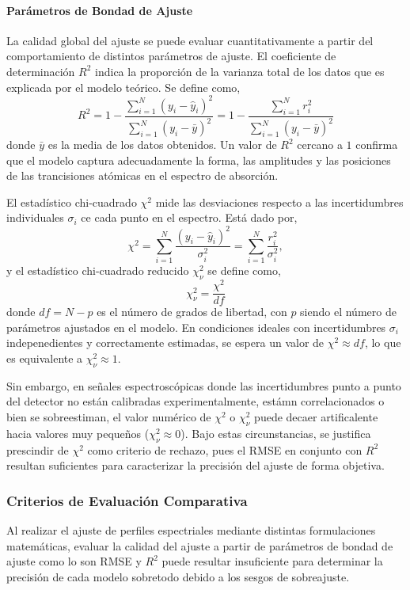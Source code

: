 \paragraph{Parámetros de Bondad de Ajuste}
La calidad global del ajuste se puede evaluar cuantitativamente a partir del comportamiento de distintos parámetros de ajuste. El coeficiente de determinación $R^2$ indica la proporción de la varianza total de los datos que es explicada por el modelo teórico. Se define como,
\begin{equation}
R^2 = 1 - \frac{\sum_{i=1}^N (y_i - \hat{y}_i)^2}{\sum_{i=1}^N (y_i - \bar{y})^2} = 1 - \frac{\sum_{i=1}^N r_i^2}{\sum_{i=1}^N (y_i - \bar{y})^2}
\end{equation}
donde $\bar{y}$ es la media de los datos obtenidos. Un valor de $R^2$ cercano a $1$ confirma que el modelo captura adecuadamente la forma, las amplitudes y las posiciones de las trancisiones atómicas en el espectro de absorción.

El estadístico chi-cuadrado $\chi^2$ mide las desviaciones respecto a las incertidumbres individuales $\sigma_i$ ce cada punto en el espectro. Está dado por,
\begin{equation}
    \chi^2 = \sum_{i=1}^N \frac{(y_i - \hat{y}_i)^2}{\sigma_i^2} = \sum_{i=1}^N \frac{r_i^2}{\sigma_i^2},
\end{equation}
y el estadístico chi-cuadrado reducido $\chi^2_\nu$ se define como,
\begin{equation}
    \chi^2_\nu = \frac{\chi^2}{df}
\end{equation}
donde $df = N - p$ es el número de grados de libertad, con $p$ siendo el número de parámetros ajustados en el modelo. En condiciones ideales con incertidumbres $\sigma_i$ indepenedientes y correctamente estimadas, se espera un valor de $\chi^2 \approx df$, lo que es equivalente a $\chi^2_\nu \approx 1$.

Sin embargo, en señales espectroscópicas donde las incertidumbres punto a punto del detector no están calibradas experimentalmente, estámn correlacionados o bien se sobreestiman, el valor numérico  de $\chi^2$ o $\chi^2_\nu$ puede decaer artificalente hacia valores muy pequeños ($\chi^2_\nu \approx 0$). Bajo estas circunstancias, se justifica prescindir de $\chi^2$ como criterio de rechazo, pues el RMSE en conjunto con $R^2$ resultan suficientes para caracterizar la precisión del ajuste de forma objetiva. 

\subsubsection{Criterios de Evaluación Comparativa}
Al realizar el ajuste de perfiles espectriales mediante distintas formulaciones matemáticas, evaluar la calidad del ajuste a partir de parámetros de bondad de ajuste como lo son RMSE y $R^2$ puede resultar insuficiente para determinar la precisión de cada modelo sobretodo debido a los sesgos de sobreajuste.


